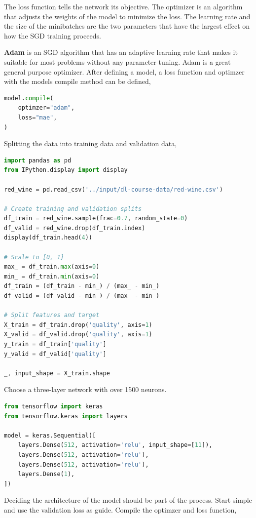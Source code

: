 \noindent The loss function tells the network its objective. The optimizer is an
algorithm that adjusts the weights of the model to minimize the loss. The learning rate
and the size of the minibatches are the two parameters that have the largest effect
on how the SGD training proceeds.

\noindent \textbf{Adam} is an SGD algorithm that has an adaptive learning rate that
makes it suitable for most problems without any parameter tuning. Adam is a great general
purpose optimizer. After defining a model, a loss function and optimzer with the models
compile method can be defined,

\begin{lstlisting}[language=Python]
model.compile(
	optimzer="adam",
	loss="mae",
)
\end{lstlisting}

\noindent Splitting the data into training data and validation data,
\begin{lstlisting}[language=Python]
import pandas as pd
from IPython.display import display

red_wine = pd.read_csv('../input/dl-course-data/red-wine.csv')

# Create training and validation splits
df_train = red_wine.sample(frac=0.7, random_state=0)
df_valid = red_wine.drop(df_train.index)
display(df_train.head(4))

# Scale to [0, 1]
max_ = df_train.max(axis=0)
min_ = df_train.min(axis=0)
df_train = (df_train - min_) / (max_ - min_)
df_valid = (df_valid - min_) / (max_ - min_)

# Split features and target
X_train = df_train.drop('quality', axis=1)
X_valid = df_valid.drop('quality', axis=1)
y_train = df_train['quality']
y_valid = df_valid['quality']

_, input_shape = X_train.shape
\end{lstlisting}

\noindent Choose a three-layer network with over 1500 neurons. 

\begin{lstlisting}[language=Python]
from tensorflow import keras
from tensorflow.keras import layers

model = keras.Sequential([
    layers.Dense(512, activation='relu', input_shape=[11]),
    layers.Dense(512, activation='relu'),
    layers.Dense(512, activation='relu'),
    layers.Dense(1),
])
\end{lstlisting}

\noindent Deciding the architecture of the model should be part of the process.
Start simple and use the validation loss as guide. Compile the optimzer and loss
function,


